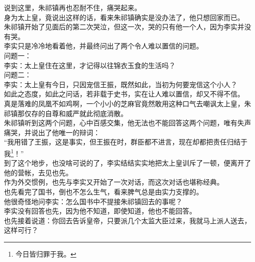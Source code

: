 \begin{multicols}{\theparacolNo}
说到这里，朱祁镇再也忍耐不住，痛哭起来。\\

身为太上皇，竟说出这样的话，看来朱祁镇确实是没办法了，他只想回家而已。\\

朱祁镇开始了见面后的第二次哭泣，但这一次，哭的只有他一个人，因为李实并没有哭。\\

李实只是冷冷地看着他，并最终问出了两个令人难以置信的问题。\\

问题一：\\

李实：太上皇住在这里，才记得以往锦衣玉食的生活吗？\\

问题二：\\

李实：太上皇有今日，只因宠信王振，既然如此，当初为何要宠信这个小人？\\

如此之态度，如此之问话，若非载于史书，实在让人难以置信，却又不得不信。\\

真是落难的凤凰不如鸡啊，一个小小的芝麻官竟然敢用这种口气去嘲讽太上皇，朱祁镇那仅存的自尊和威严就此彻底消散。\\

朱祁镇听到这两个问题，心中百感交集，他无法也不能回答这两个问题，唯有失声痛哭，并说出了他唯一的辩词：\\

“我用错了王振，这是事实，但王振在时，群臣都不进言，现在却都把责任归结于我\footnote{今日皆归罪于我。}！”\\

到了这个地步，也没啥可说的了，李实结结实实地把太上皇训斥了一顿，便离开了他的营帐，去见也先。\\

作为外交惯例，也先与李实又开始了一次对话，而这次对话也堪称经典。\\

也先看完了国书，倒也不怎么生气，看来脾气总是由实力支撑的。\\

他很奇怪地问李实：怎么国书中不提接朱祁镇回去的事呢？\\

李实没有回答也先，因为他不知道，即使知道，他也不能回答。\\

也先接着说道：你回去告诉皇帝，只要派几个太监大臣过来，我就马上派人送去，这样可行？\\


\end{multicols}
